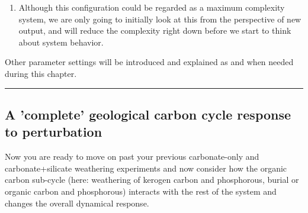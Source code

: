 \begin{enumerate}[noitemsep]
However, this only really 'works' if the system is in some sort of balance of weathering and precipitation and that alkalinity added to the surface ocean can fully equilibriate with the atmosphere ... which will not be the case during transient events (see Figure 3 in: \textit{Lord et al.} [2015]). Setting: \textsf{\footnotesize rg\_opt\_short\_circuit\_atm=.false.} instead tracks the \(CO_{2}\) fluxes explicitly and in full.
\\The potential implications of this will be a subject of a subsequent investigation ...
\\NOTE: A 'short-circuit' is fine if you are only looking at long-term weathering vs. sedimentation steady-states and not rapid carbon release driven transients.

\vspace{1mm}
\item Although this configuration could be regarded as a maximum complexity system, we are only going to initially look at this from the perspective of new output, and will reduce the complexity right down before we start to think about system behavior.

\end{enumerate}

\vspace{2mm}
\noindent Other parameter settings will be introduced and explained as and when needed during this chapter.

\vspace{1mm}\noindent\rule{4cm}{0.1mm}\vspace{2mm}

\newpage

\subsection{A 'complete' geological carbon cycle response to perturbation}

Now you are ready to move on past your previous carbonate-only and carbonate+silicate weathering experiments and now consider how the organic carbon sub-cycle (here: weathering of kerogen carbon and phosphorous, burial or organic carbon and phosphorous) interacts with the rest of the system and changes the overall dynamical response.

